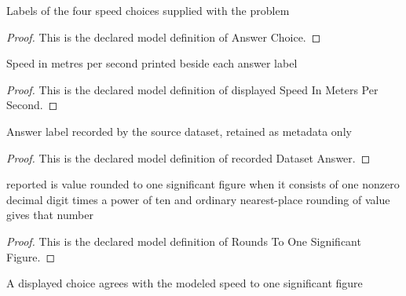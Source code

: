 \begin{definition}
  \label{def:physics:phyx-mini-0643:phyxminiproblems-problemphyxmini0643-answerchoice}
  Labels of the four speed choices supplied with the problem
\end{definition}
\begin{proof}
  This is the declared model definition of Answer Choice.
\end{proof}
\begin{definition}
  \label{def:physics:phyx-mini-0643:phyxminiproblems-problemphyxmini0643-displayedspeedinmeterspersecond}
  Speed in metres per second printed beside each answer label
\end{definition}
\begin{proof}
  This is the declared model definition of displayed Speed In Meters Per Second.
\end{proof}
\begin{definition}
  \label{def:physics:phyx-mini-0643:phyxminiproblems-problemphyxmini0643-recordeddatasetanswer}
  Answer label recorded by the source dataset, retained as metadata only
\end{definition}
\begin{proof}
  This is the declared model definition of recorded Dataset Answer.
\end{proof}
\begin{definition}
  \label{def:physics:phyx-mini-0643:phyxminiproblems-problemphyxmini0643-roundstoonesignificantfigure}
  reported is value rounded to one significant figure when it consists of one nonzero decimal digit times a power of ten and ordinary nearest-place rounding of value gives that number
\end{definition}
\begin{proof}
  This is the declared model definition of Rounds To One Significant Figure.
\end{proof}
\begin{definition}
  \label{def:physics:phyx-mini-0643:phyxminiproblems-problemphyxmini0643-matchesdisplayedspeed}
  A displayed choice agrees with the modeled speed to one significant figure
\end{definition}
